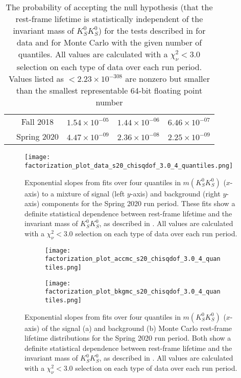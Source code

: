 \begin{table}
\begin{center}
\begin{tabular}{ccccc}
       & Fall 2018 & $1.54 \times 10^{-05}$ & $1.44 \times 10^{-06}$ & $6.46 \times 10^{-07}$\\
       & Spring 2020 & $4.47 \times 10^{-09}$ & $2.36 \times 10^{-08}$ & $2.25 \times 10^{-09}$\\\bottomrule
    \end{tabular}
    \caption{The probability of accepting the null hypothesis (that the rest-frame lifetime is statistically independent of the invariant mass of $K_S^0K_S^0$) for the tests described in  for data and  for Monte Carlo with the given number of quantiles. All values are calculated with a $\chi^2_\nu < 3.0$ selection on each type of data over each run period. Values listed as $<2.23 \times 10^{-308}$ are nonzero but smaller than the smallest representable 64-bit floating point number}\label{tab:factorization-results}
  \end{center}
\end{table}

\begin{figure}
  \begin{center}
    \texttt{[image: factorization\_plot\_data\_s20\_chisqdof\_3.0\_4\_quantiles.png]}
  \end{center}
  \caption{Exponential slopes from fits over four quantiles in $m(K_S^0K_S^0)$ ($x$-axis) to a mixture of signal (left $y$-axis) and background (right $y$-axis) components for the Spring 2020 run period. These fits show a definite statistical dependence between rest-frame lifetime and the invariant mass of $K_S^0K_S^0$, as described in . All values are calculated with a $\chi^2_\nu < 3.0$ selection on each type of data over each run period.}\label{fig:data-factorization-fit}
\end{figure}

\begin{figure}
  \begin{center}
    \begin{subfigure}[b]{.8\columnwidth}
      \texttt{[image: factorization\_plot\_accmc\_s20\_chisqdof\_3.0\_4\_quantiles.png]}
      \caption{}
      \label{fig:mc-factorization-fits-a}
    \end{subfigure}
    \begin{subfigure}[b]{.8\columnwidth}
      \texttt{[image: factorization\_plot\_bkgmc\_s20\_chisqdof\_3.0\_4\_quantiles.png]}
      \caption{}
      \label{fig:mc-factorization-fits-b}
    \end{subfigure}
  \end{center}
  \caption{Exponential slopes from fits over four quantiles in $m(K_S^0K_S^0)$ ($x$-axis) of the signal (a) and background (b) Monte Carlo rest-frame lifetime distributions for the Spring 2020 run period. Both show a definite statistical dependence between rest-frame lifetime and the invariant mass of $K_S^0K_S^0$, as described in . All values are calculated with a $\chi^2_\nu < 3.0$ selection on each type of data over each run period.}\label{fig:mc-factorization-fits}
\end{figure}

